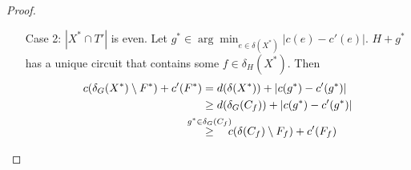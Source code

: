 \documentclass[11pt, a4paper]{article}
\newcommand{\stackalign}[2]{\stackrel{\mathclap{#1}}{#2}}
\newcommand{\abs}[1]{\left\lvert#1\right\rvert}
\theoremstyle{remark}
\theoremstyle{definition}
\begin{document}
\begin{proof}
\begin{enumerate}
		\item[Case 2:] $\abs{X^*\cap T'}$ is even. Let
		$g^*\in\arg\min_{e\in\delta(X^*)} \abs{c(e)-c'(e)}$. $H+g^*$ has a
		unique circuit that contains some $f\in \delta_H(X^*)$. Then
		\begin{align*}
			c(\delta_G(X^*)\setminus F^*)+c'(F^*) & = d(\delta(X^*))+\abs{c(g^*)-c'(g^*)}                                           \\
			                                      & \geq d(\delta_G(C_f))+\abs{c(g^*)-c'(g^*)}                                      \\
			                                      & \stackalign{g^*\in\delta_G(C_f)}{\geq}\quad c(\delta(C_f)\setminus F_f)+c'(F_f)
		\end{align*}
	\end{enumerate}
\end{proof}
\end{document}
